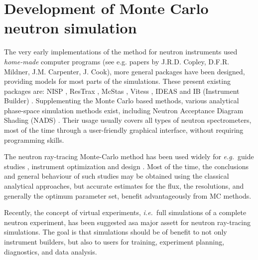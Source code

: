 \section{Development of Monte Carlo neutron simulation}
The very early implementations of the method for neutron instruments used \emph{home-made} computer programs  (see e.g. papers by J.R.D. Copley, D.F.R. Mildner, J.M. Carpenter, J. Cook), more general packages have been designed, providing models for most parts of the simulations.
These present existing packages are: NISP \cite{NISP}, ResTrax
\cite{Restrax}, McStas
\cite{nn_10_20,mcstas_pb,mcstas_2_jnr,mcstas_webpage}, Vitess
\cite{Vitess,vitess_webpage}, IDEAS \cite{IDEAS} and IB (Instrument
Builder) \cite{IB_webpage}. Supplementing the Monte Carlo based
methods, various analytical phase-space simulation methods exist,
including Neutron Acceptance Diagram Shading (NADS) \cite{NADS_webpage}.
Their usage usually covers all types of neutron spectrometers, most of the time through a user-friendly graphical interface, without requiring programming skills.

The neutron ray-tracing Monte-Carlo method has been used widely for
{\em e.g.}\ guide studies \cite{Copley93,Farhi02,Schanzer04},
instrument optimization and design \cite{Zsigmond04,Lieutenant05}.
Most of the time, the conclusions and general behaviour of such studies
may be obtained using the classical analytical approaches,
but accurate estimates for the flux, the resolutions,
and generally the optimum parameter set, benefit advantageously from MC methods.

Recently, the concept of virtual experiments, {\em i.e.}\ full simulations
of a complete neutron experiment, has been suggested asa major assett for neutron ray-tracing simulations. The goal is that
simulations should be of benefit to not only instrument builders, but also
to users for training, experiment planning, diagnostics, and data
analysis.


